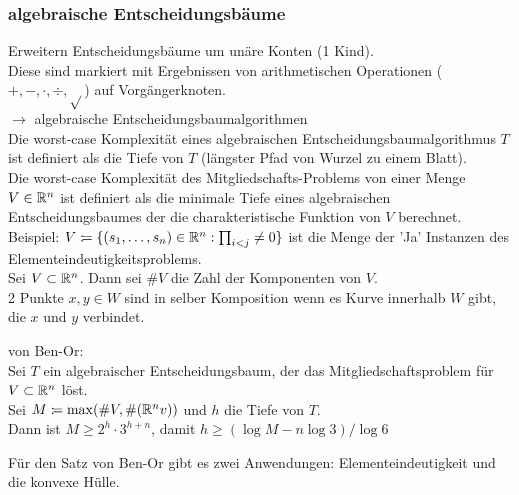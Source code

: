\subsubsection{algebraische Entscheidungsbäume}
Erweitern Entscheidungsbäume um unäre Konten (1 Kind).\\
Diese sind markiert mit Ergebnissen von arithmetischen Operationen ($+,-,\cdot,\div,\sqrt{}$) auf Vorgängerknoten.\\
$\to$ algebraische Entscheidungsbaumalgorithmen\\
Die worst-case Komplexität eines algebraischen Entscheidungsbaumalgorithmus $T$ ist definiert als die Tiefe von $T$ (längster Pfad von Wurzel zu einem Blatt).\\
Die worst-case Komplexität des Mitgliedschafts-Problems von einer Menge $V \in \mathbb{R}^n$ ist definiert als die minimale Tiefe eines algebraischen Entscheidungsbaumes der die charakteristische Funktion von $V$ berechnet.\\
Beispiel: $V :\!= \{(s_1,\ldots,s_n) \in \mathbb{R}^n : \prod_{i < j} \ne 0 \}$ ist die Menge der 'Ja' Instanzen des Elementeindeutigkeitsproblems.\\
Sei $V \subset \mathbb{R}^n$. Dann sei $\#V$ die Zahl der Komponenten von $V$.\\
2 Punkte $x,y \in W$ sind in selber Komposition wenn es Kurve innerhalb $W$ gibt, die $x$ und $y$ verbindet.\\
\begin{satz}
von Ben-Or:\\
Sei $T$ ein algebraischer Entscheidungsbaum, der das Mitgliedschaftsproblem für $V \subset \mathbb{R}^n$ löst.\\
Sei $M :\!= \max(\#V,\#(\mathbb{R}^n v))$ und $h$ die Tiefe von $T$.\\
Dann ist $M \geq 2^h \cdot 3^{h+ n}$, damit $h \geq (\log M - n \log 3)/\log 6$
\end{satz}
Für den Satz von Ben-Or gibt es zwei Anwendungen: Elementeindeutigkeit und die konvexe Hülle.
